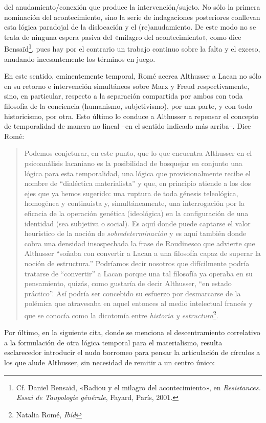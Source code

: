 del anudamiento/conexión que produce la intervención/sujeto. No sólo la primera nominación del acontecimiento, sino la serie de indagaciones posteriores conllevan esta lógica paradojal de la dislocación y el (re)anudamiento. De este modo no se trata de ninguna espera pasiva del «milagro del acontecimiento», como dice Bensaïd\footnote{Cf. Daniel Bensaïd, «Badiou y el milagro del acontecimiento», en \emph{Resistances. Essai de Taupologie générale}, Fayard, París, 2001.}, pues hay por el contrario un trabajo continuo sobre la falta y el exceso, anudando incesantemente los términos en juego.

En este sentido, eminentemente temporal, Romé acerca Althusser a Lacan no sólo en su retorno e intervención simultáneos sobre Marx y Freud respectivamente, sino, en particular, respecto a la separación compartida por ambos con toda filosofía de la conciencia (humanismo, subjetivismo), por una parte, y con todo historicismo, por otra. Esto último lo conduce a Althusser a repensar el concepto de temporalidad de manera no lineal --en el sentido indicado más arriba--. Dice Romé:

\begin{quote}
Podemos conjeturar, en este punto, que lo que encuentra Althusser en el psicoanálisis lacaniano es la posibilidad de bosquejar en conjunto una lógica para esta temporalidad, una lógica que provisionalmente recibe el nombre de ``dialéctica materialista'' y que, en principio atiende a los dos ejes que ya hemos sugerido: una ruptura de toda génesis teleológica, homogénea y continuista y, simultáneamente, una interrogación por la eficacia de la operación genética (ideológica) en la configuración de una identidad (sea subjetiva o social). Es aquí donde puede captarse el valor heurístico de la noción de \emph{sobredeterminación} y es aquí también donde cobra una densidad insospechada la frase de Roudinesco que advierte que Althusser ``soñaba con convertir a Lacan a una filosofía capaz de superar la noción de estructura.'' Podríamos decir nosotros que difícilmente podría tratarse de ``convertir'' a Lacan porque una tal filosofía ya operaba en su pensamiento, quizás, como gustaría de decir Althusser, ``en estado práctico''. Así podría ser concebido su esfuerzo por desmarcarse de la polémica que atravesaba en aquel entonces al medio intelectual francés y que se conocía como la dicotomía entre \emph{historia y estructura}\footnote{Natalia Romé, \emph{Ibíd}}.
\end{quote}

Por último, en la siguiente cita, donde se menciona el descentramiento correlativo a la formulación de otra lógica temporal para el materialismo, resulta esclarecedor introducir el nudo borromeo para pensar la articulación de círculos a los que alude Althusser, sin necesidad de remitir a un centro único:

